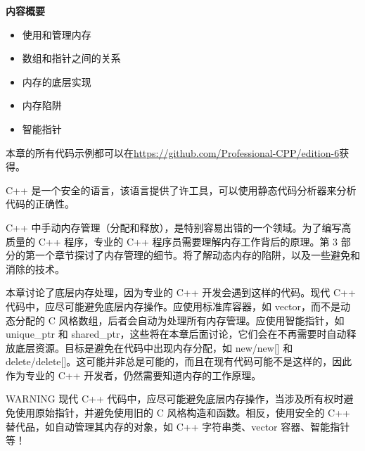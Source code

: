 \noindent
\textbf{内容概要}

\begin{itemize}
\item
使用和管理内存

\item
数组和指针之间的关系

\item
内存的底层实现

\item
内存陷阱

\item
智能指针
\end{itemize}

本章的所有代码示例都可以在\url{https://github.com/Professional-CPP/edition-6}获得。

C++ 是一个安全的语言，该语言提供了许工具，可以使用静态代码分析器来分析代码的正确性。

C++ 中手动内存管理（分配和释放），是特别容易出错的一个领域。为了编写高质量的 C++ 程序，专业的 C++ 程序员需要理解内存工作背后的原理。第 3 部分的第一个章节探讨了内存管理的细节。将了解动态内存的陷阱，以及一些避免和消除的技术。

本章讨论了底层内存处理，因为专业的 C++ 开发会遇到这样的代码。现代 C++ 代码中，应尽可能避免底层内存操作。应使用标准库容器，如 vector，而不是动态分配的 C 风格数组，后者会自动为处理所有内存管理。应使用智能指针，如 unique\_ptr 和 shared\_ptr，这些将在本章后面讨论，它们会在不再需要时自动释放底层资源。目标是避免在代码中出现内存分配，如 new/new[] 和 delete/delete[]。这可能并非总是可能的，而且在现有代码可能不是这样的，因此作为专业的 C++ 开发者，仍然需要知道内存的工作原理。

\begin{myWarning}{WARNING}
现代 C++ 代码中，应尽可能避免底层内存操作，当涉及所有权时避免使用原始指针，并避免使用旧的 C 风格构造和函数。相反，使用安全的 C++ 替代品，如自动管理其内存的对象，如 C++ 字符串类、vector 容器、智能指针等！
\end{myWarning}




